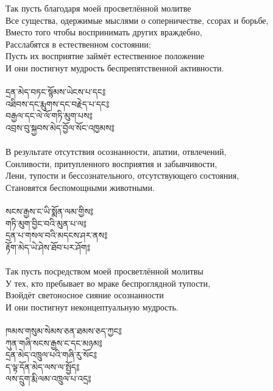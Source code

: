 Так пусть благодаря моей просветлённой молитве \\
Все существа, одержимые мыслями о соперничестве, ссорах и борьбе, \\
Вместо того чтобы воспринимать других враждебно, \\
Расслабятся в естественном состоянии; \\
Пусть их восприятие займёт естественное положение \\
И они постигнут мудрость беспрепятственной активности.\\
\\
\newpage
{\ti
དྲན་མེད་བཏང་སྙོམས་ཡེངས་པ་དང༔ \\
འཐིབས་དང་རྨུགས་དང་བརྗེད་པ་དང༔ \\
བརྒྱལ་དང་ལེ་ལོ་གཏི་མུག་པས༔ \\
འབྲས་བུ་སྐྱབས་མེད་བྱོལ་སོང་འཁྱམས༔}\\
\\
В результате отсутствия осознанности, апатии, отвлечений, \\
Сонливости, притупленного восприятия и забывчивости, \\
Лени, тупости и бессознательного, отсутствующего состояния, \\
Становятся беспомощными животными.\\
\\
{\ti
སངས་རྒྱས་ང་ཡི་སྨོན་ལམ་གྱིས༔ \\
གཏི་མུག་བྱིང་བའི་མུན་པ་ལ༔ \\
དྲན་པ་གསལ་བའི་མདངས་ཤར་ནས༔ \\
རྟོག་མེད་ཡེ་ཤེས་ཐོབ་པར་ཤོག༔}\\
\\

Так пусть посредством моей просветлённой молитвы \\
У тех, кто пребывает во мраке беспроглядной тупости, \\
Взойдёт светоносное сияние осознанности \\
И они постигнут неконцептуальную мудрость.\\
\\
\newpage
{\ti
ཁམས་གསུམ་སེམས་ཅན་ཐམས་ཅད་ཀྱང༔ \\
ཀུན་གཞི་སངས་རྒྱས་ང་དང་མཉམ༔ \\
དྲན་མེད་འཁྲུལ་པའི་གཞི་རུ་སོང༔ \\
ད་ལྟ་དོན་མེད་ལས་ལ་སྤྱོད༔\\
ལས་དྲུག་རྨི་ལམ་འཁྲུལ་པ་འདྲ༔}\\
\\

